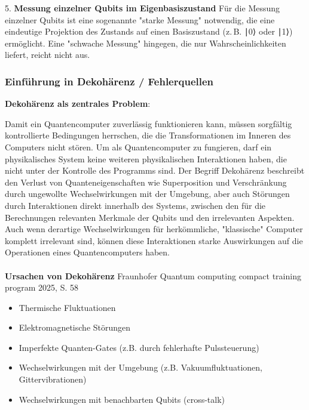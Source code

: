 5. \textbf{Messung einzelner Qubits im Eigenbasiszustand} 
Für die Messung einzelner Qubits ist eine sogenannte "starke Messung" notwendig, die eine eindeutige Projektion des Zustands auf einen Basiszustand (z. B. ∣0⟩ oder ∣1⟩) ermöglicht. Eine "schwache Messung" hingegen, die nur Wahrscheinlichkeiten liefert, reicht nicht aus. 

\cite{divincenzo_topics_nodate}
 
\subsubsection{Einführung in Dekohärenz / Fehlerquellen}

\textbf{Dekohärenz als zentrales Problem}: 

Damit ein Quantencomputer zuverlässig funktionieren kann, müssen sorgfältig kontrollierte Bedingungen herrschen, die die Transformationen im Inneren des Computers nicht stören. Um als Quantencomputer zu fungieren, darf ein physikalisches System keine weiteren physikalischen Interaktionen haben, die nicht unter der Kontrolle des Programms sind. Der Begriff Dekohärenz beschreibt den Verlust von Quanteneigenschaften wie Superposition und Verschränkung durch ungewollte Wechselwirkungen mit der Umgebung, aber auch Störungen durch Interaktionen direkt innerhalb des Systems, zwischen den für die Berechnungen relevanten Merkmale der Qubits und den irrelevanten Aspekten. 
Auch wenn derartige Wechselwirkungen für herkömmliche, "klassische" Computer komplett irrelevant sind, können diese Interaktionen starke Auswirkungen auf die Operationen eines Quantencomputers haben. 
\cite{mermin_quantum_2012}\\
\\
\textbf{Ursachen von Dekohärenz}
Fraunhofer Quantum computing compact training program 2025, S. 58 


\begin{itemize}
    \item Thermische Fluktuationen
    \item Elektromagnetische Störungen
    \item Imperfekte Quanten-Gates (z.B. durch fehlerhafte Pulssteuerung)
    \item Wechselwirkungen mit der Umgebung (z.B. Vakuumfluktuationen, Gittervibrationen)
    \item Wechselwirkungen mit benachbarten Qubits (cross-talk)
\end{itemize}
\cite{fraunhofer_iais_quantum_2023}
\cite{mermin_quantum_2012}



